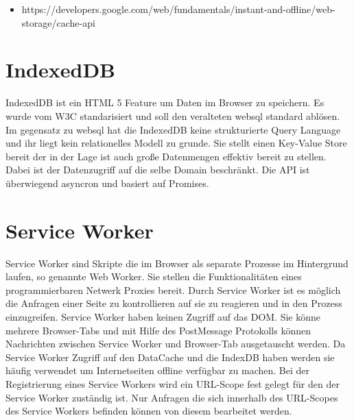 \begin{itemize}
	\item https://developers.google.com/web/fundamentals/instant-and-offline/web-storage/cache-api
\end{itemize}


\section{IndexedDB}

IndexedDB ist ein HTML 5 Feature um Daten im Browser zu speichern. Es wurde vom W3C standarisiert\cite{w3IndexedDB} und soll den veralteten websql standard ablösen. Im gegensatz zu websql hat die IndexedDB keine strukturierte Query Language und ihr liegt kein relationelles Modell zu grunde. Sie stellt einen Key-Value Store bereit der in der Lage ist auch große Datenmengen effektiv bereit zu stellen. Dabei ist der Datenzugriff auf die selbe Domain beschränkt. Die API ist überwiegend asyncron und basiert auf Promises.

\section{Service Worker}
Service Worker sind Skripte die im Browser als separate Prozesse im Hintergrund laufen, so genannte Web Worker. Sie stellen die Funktionalitäten eines programmierbaren Netwerk Proxies bereit. Durch Service Worker ist es möglich die Anfragen einer Seite zu kontrollieren auf sie zu reagieren und in den Prozess einzugreifen.\cite{w3ServiceWorker} Service Worker haben keinen Zugriff auf das DOM. Sie könne mehrere Browser-Tabs und mit Hilfe des PostMessage Protokolls können Nachrichten zwischen Service Worker und Browser-Tab ausgetauscht werden. Da Service Worker Zugriff auf den DataCache und die IndexDB haben werden sie häufig verwendet um Internetseiten offline verfügbar zu machen. Bei der Registrierung eines Service Workers wird ein URL-Scope fest gelegt für den der Service Worker zuständig ist. Nur Anfragen die sich innerhalb des URL-Scopes des Service Workers befinden können von diesem bearbeitet werden.

